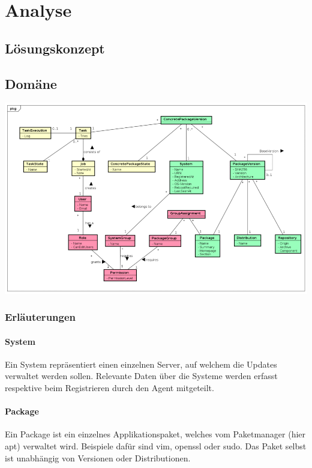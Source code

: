\chapter{Analyse}
\section{Lösungskonzept}

\xxx

\section{Domäne}

\includegraphics[width=\textwidth]{files/DomainModel_small}

\subsection*{Erläuterungen}

\subsubsection{System}

Ein System repräsentiert einen einzelnen Server, auf welchem die Updates verwaltet werden sollen. Relevante Daten über die Systeme werden erfasst respektive beim Registrieren durch den Agent mitgeteilt.

\subsubsection{Package}

Ein Package ist ein einzelnes Applikationspaket, welches vom Paketmanager (hier apt) verwaltet wird. Beispiele dafür sind vim, openssl oder sudo. Das Paket selbst ist unabhängig von Versionen oder Distributionen.

